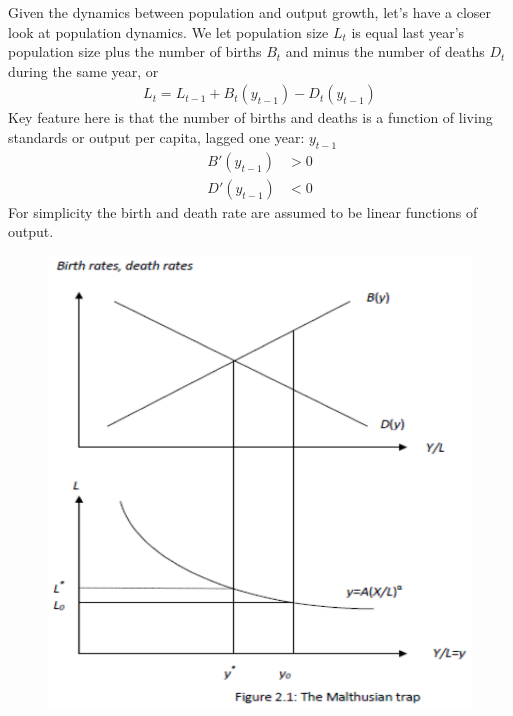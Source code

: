 \documentclass{beamer}
\begin{document}
\begin{frame}
 Given the dynamics between population and output growth, let's have a closer look at population dynamics. 
 We let population size $L_t$ is equal last year's population size plus the number of births $B_t$ and minus the number of deaths $D_t$ during the same year, or
  \begin{align}
   L_t = L_{t-1} + B_t(y_{t-1}) - D_t(y_{t-1})
  \end{align}
  \medskip
  Key feature here is that the number of births and deaths is a function of living standards or output per capita, lagged one year: $y_{t-1}$
  \begin{align}
    B'(y_{t-1})&>0\\
    D'(y_{t-1})&<0  
  \end{align}
  \medskip
  For simplicity the birth and death rate are assumed to be linear functions of output.
\end{frame}

\begin{frame} 
  \begin{figure}
    \includegraphics[scale=.7]{malthusian_trap.eps}
  \end{figure}
\end{frame}
\end{document}
